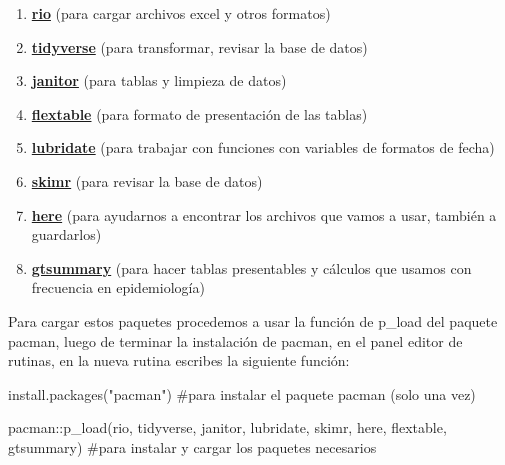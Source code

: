\documentclass[
  letterpaper,
  DIV=11,
  numbers=noendperiod]{scrreprt}
\newenvironment{Shaded}{\begin{snugshade}}{\end{snugshade}}
\newcommand{\CommentTok}[1]{\textcolor[rgb]{0.37,0.37,0.37}{#1}}
\newcommand{\FunctionTok}[1]{\textcolor[rgb]{0.28,0.35,0.67}{#1}}
\newcommand{\NormalTok}[1]{\textcolor[rgb]{0.00,0.23,0.31}{#1}}
\newcommand{\SpecialCharTok}[1]{\textcolor[rgb]{0.37,0.37,0.37}{#1}}
\newcommand{\StringTok}[1]{\textcolor[rgb]{0.13,0.47,0.30}{#1}}
\begin{document}
\begin{enumerate}
\def\labelenumi{\arabic{enumi}.}
\item
  \href{https://cran.r-project.org/web/packages/rio/vignettes/rio.html}{\textbf{rio}}
  (para cargar archivos excel y otros formatos)
\item
  \href{https://cran.r-project.org/web/packages/tidyverse/vignettes/paper.html}{\textbf{tidyverse}}
  (para transformar, revisar la base de datos)
\item
  \href{https://cran.r-project.org/web/packages/janitor/vignettes/janitor.html}{\textbf{janitor}}
  (para tablas y limpieza de datos)
\item
  \href{https://cran.r-project.org/web/packages/flextable/index.html}{\textbf{flextable}}
  (para formato de presentación de las tablas)
\item
  \href{https://cran.r-project.org/web/packages/lubridate/vignettes/lubridate.html}{\textbf{lubridate}}
  (para trabajar con funciones con variables de formatos de fecha)
\item
  \href{https://cran.r-project.org/web/packages/skimr/vignettes/skimr.html}{\textbf{skimr}}
  (para revisar la base de datos)
\item
  \href{https://cran.r-project.org/web/packages/here/vignettes/here.html}{\textbf{here}}
  (para ayudarnos a encontrar los archivos que vamos a usar, también a
  guardarlos)
\item
  \href{https://www.danieldsjoberg.com/gtsummary/}{\textbf{gtsummary}}
  (para hacer tablas presentables y cálculos que usamos con frecuencia
  en epidemiología)
\end{enumerate}

Para cargar estos paquetes procedemos a usar la función de p\_load del
paquete pacman, luego de terminar la instalación de pacman, en el panel
editor de rutinas, en la nueva rutina escribes la siguiente función:

\begin{Shaded}
\begin{Highlighting}[]
\FunctionTok{install.packages}\NormalTok{(}\StringTok{"pacman"}\NormalTok{) }\CommentTok{\#para instalar el paquete pacman (solo una vez)}
\end{Highlighting}
\end{Shaded}

\begin{Shaded}
\begin{Highlighting}[]
\NormalTok{pacman}\SpecialCharTok{::}\FunctionTok{p\_load}\NormalTok{(rio, }
\NormalTok{               tidyverse, }
\NormalTok{               janitor, }
\NormalTok{               lubridate, }
\NormalTok{               skimr, }
\NormalTok{               here,}
\NormalTok{               flextable,}
\NormalTok{               gtsummary) }\CommentTok{\#para instalar y cargar los paquetes necesarios}
\end{Highlighting}
\end{Shaded}
\end{document}
